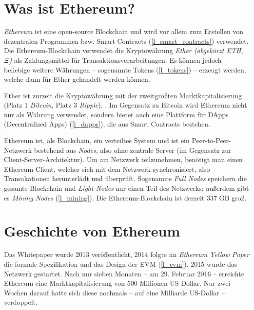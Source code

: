 \section{Was ist Ethereum?}
\textit{Ethereum} ist eine open-source Blockchain und wird vor allem zum Erstellen von dezentralen Programmen bzw. Smart Contracts (\ref{l_smart_contracts}) verwendet.
Die Ethereum-Blockchain verwendet die Kryptowährung \textit{Ether (abgekürzt ETH, $\Xi$)} als Zahlungsmittel für Transaktionsverarbeitungen. Es können jedoch beliebige weitere Währungen -- sogenannte Tokens (\ref{l_tokens}) -- erzeugt werden, welche dann für Ether gehandelt werden können.

Ether ist zurzeit die Kryptowährung mit der zweitgrößten Marktkapitalisierung (Platz 1 \textit{Bitcoin}, Platz 3 \textit{Ripple}). \cite[Wikipedia, Ethereum]{Ethereum_Wikipedia}.
Im Gegensatz zu Bitcoin wird Ethereum nicht nur als Währung verwendet, sondern bietet auch eine Plattform für DApps (Decentralized Apps) (\ref{l_dapps}), die aus Smart Contracts bestehen.
 
Ethereum ist, als Blockchain, ein verteiltes System und ist ein Peer-to-Peer-Netzwerk bestehend aus \textit{Nodes}, also ohne zentrale Server (im Gegensatz zur Client-Server-Architektur).
Um am Netzwerk teilzunehmen, benötigt man einen Ethereum-Client, welcher sich mit dem Netzwerk synchronisiert, also Transakationen herunterlädt und überprüft.
Sogenannte \textit{Full Nodes} speichern die gesamte Blockchain und \textit{Light Nodes} nur einen Teil des Netzwerks; außerdem gibt es \textit{Mining Nodes} (\ref{l_mining}).
Die Ethereum-Blockchain ist derzeit 337 GB groß.

\section{Geschichte von Ethereum}
Das Whitepaper wurde 2013 veröffentlicht, 2014 folgte im \textit{Ethereum Yellow Paper} die formale Spezifikation und das Design der EVM (\ref{l_evm}). 2015 wurde das Netzwerk gestartet. Nach nur sieben Monaten -- am 29. Februar 2016 -- erreichte Ethereum eine Marktkapitalisierung von 500 Millionen US-Dollar. Nur zwei Wochen darauf hatte sich diese nochmals -- auf eine Milliarde US-Dollar -- verdoppelt.

